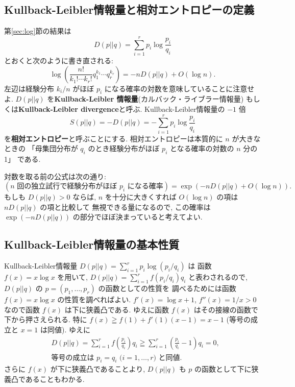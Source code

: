 \documentclass[12pt,twoside]{jarticle}
\theoremstyle{jplain}
\theoremstyle{jplain}
\theoremstyle{jplain}
\numberwithin{theorem}{section}
\numberwithin{equation}{section}
\numberwithin{figure}{section}
\numberwithin{table}{section}
\newcommand\secref[1]{第\ref{#1}節}
\begin{document}

\subsection{Kullback-Leibler情報量と相対エントロピーの定義}

\secref{sec:log}の結果は
\[
D(p||q)=\sum_{i=1}^r p_i\log\frac{p_i}{q_i}
\]
とおくと次のように書き直される:
\[
\log\left(\frac{n!}{k_1!\cdots k_r!} q_1^{k_1}\cdots q_r^{k_r}\right)
=-n D(p||q) + O(\log n).
\]
左辺は経験分布 $k_i/n$ がほぼ $p_i$ になる確率の対数を意味していることに注意せよ.
$D(p||q)$ を{\bf Kullback-Leibler 情報量}(カルバック・ライブラー情報量)
もしくは{\bf Kullback-Leibler divergence}と呼ぶ.
Kullback-Leibler情報量の $-1$ 倍
\[
S(p||q) = -D(p||q) = - \sum_{i=1}^r p_i\log\frac{p_i}{q_i}
\]
を{\bf 相対エントロピー}と呼ぶことにする.
相対エントロピーは本質的に $n$ が大きなときの
「母集団分布が $q_i$ のとき経験分布がほぼ $p_i$ となる確率の対数の $n$ 分の1」
である.

対数を取る前の公式は次の通り:
\[
(\text{$n$ 回の独立試行で経験分布がほぼ $p_i$ になる確率})
=\exp(-n D(p||q) + O(\log n)).
\]
もしも $D(p||q)>0$ ならば,  
$n$ を十分に大きくすれば $O(\log n)$ の項は $n D(p||q)$ の項と比較して
無視できる量になるので, 
この確率は $\exp(-n D(p||q))$ の部分でほぼ決まっていると考えてよい. 


\subsection{Kullback-Leibler情報量の基本性質}
\label{sec:KL-prop}

Kullback-Leibler情報量 $D(p||q)=\sum_{i=1}^r p_i\log(p_i/q_i)$ は
函数 $f(x)=x\log x$ を用いて, 
$D(p||q)=\sum_{i=1}^r f(p_i/q_i)q_i$ と表わされるので, 
$D(p||q)$ の $p=(p_1,\ldots,p_r)$ の函数としての性質を
調べるためには函数 $f(x)=x\log x$ の性質を調べればよい.
$f'(x)=\log x + 1$, $f''(x)=1/x>0$ なので函数 $f(x)$ は下に狭義凸である.
ゆえに函数 $f(x)$ はその接線の函数で下から押さえられる.
特に $f(x)\geqq f(1)+f'(1)(x-1)=x-1$ (等号の成立と $x=1$ は同値).
ゆえに
\begin{align*}
&
D(p||q)
=\sum_{i=1}^r f\left(\frac{p_i}{q_i}\right)q_i
\geqq \sum_{i=1}^r\left(\frac{p_i}{q_i}-1\right)q_i
=0,
\\ &
\text{等号の成立は $p_i=q_i$ ($i=1,\ldots,r$) と同値.}
\end{align*}
さらに $f(x)$ が下に狭義凸であることより, 
$D(p||q)$ も $p$ の函数として下に狭義凸であることもわかる.
\end{document}
